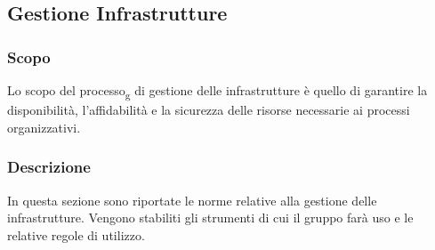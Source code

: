 \subsection{Gestione Infrastrutture}
\subsubsection{Scopo} 
Lo scopo del processo\textsubscript{g} di gestione delle infrastrutture è quello di garantire la disponibilità, l’affidabilità e la sicurezza delle risorse necessarie ai processi organizzativi.
\subsubsection{Descrizione}
In questa sezione sono riportate le norme relative alla gestione delle infrastrutture. Vengono stabiliti gli strumenti di cui il gruppo farà uso e le relative regole di utilizzo.


